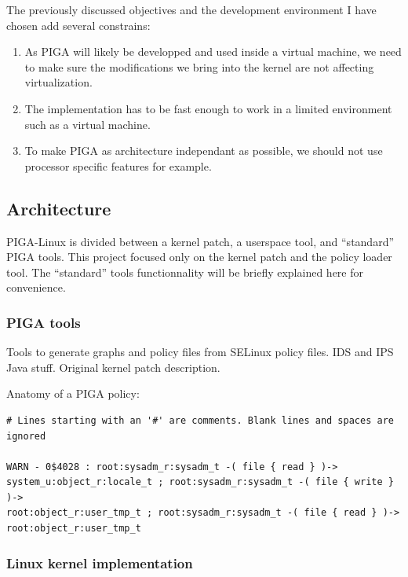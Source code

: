 \documentclass[pdftex,a4paper,titlepage,11pt]{article}
\begin{document}
\smallskip

The previously discussed objectives and the development environment I have
chosen add several constrains:

\begin{enumerate}
	\item As PIGA will likely be developped and used inside a virtual machine,
we need to make sure the modifications we bring into the kernel are not
affecting virtualization.
	\item The implementation has to be fast enough to work in a limited
environment such as a virtual machine.
	\item To make PIGA as architecture independant as possible, we should not
use processor specific features for example.
\end{enumerate}


\subsection{Architecture}

PIGA-Linux is divided between a kernel patch, a userspace tool, and ``standard''
PIGA tools. This project focused only on the kernel patch and the policy loader
tool. The ``standard'' tools functionnality will be briefly explained here for
convenience.

\subsubsection{PIGA tools}

Tools to generate graphs and policy files from SELinux policy files. IDS and IPS
Java stuff. Original kernel patch description.

Anatomy of a PIGA policy:

\begin{lstlisting}
# Lines starting with an '#' are comments. Blank lines and spaces are ignored

WARN - 0$4028 : root:sysadm_r:sysadm_t -( file { read } )->
system_u:object_r:locale_t ; root:sysadm_r:sysadm_t -( file { write } )->
root:object_r:user_tmp_t ; root:sysadm_r:sysadm_t -( file { read } )->
root:object_r:user_tmp_t
\end{lstlisting}


\subsubsection{Linux kernel implementation}
\end{document}

